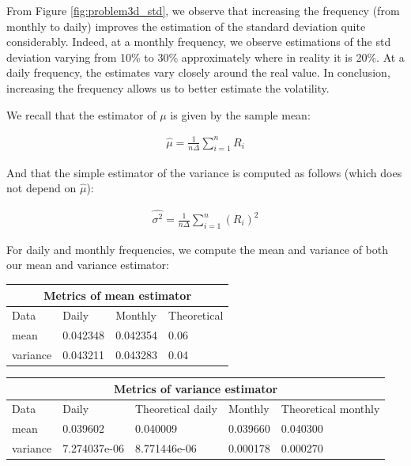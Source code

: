 \documentclass[10pt]{article}
\newenvironment{exercise}[2][Exercise]{\begin{trivlist}
  \item[\hskip \labelsep {\bfseries #1}\hskip \labelsep {\bfseries #2.}]}{\end{trivlist}}
\begin{document}
\begin{exercise}{3}
	\smallbreak
	
	From Figure \ref{fig:problem3d_std}, we observe that increasing the frequency (from monthly to daily) improves the estimation of the standard deviation quite considerably. Indeed, at a monthly frequency, we observe estimations of the std deviation varying from 10\% to 30\% approximately where in reality it is 20\%. At a daily frequency, the estimates vary closely around the real value. In conclusion, increasing the frequency allows us to better estimate the volatility. 
  
	\bigbreak
	
	 We recall that the estimator of $\mu$ is given by the sample mean:
	 
	\begin{align*}
		\hat{\mu} = \frac{1}{n \Delta}\sum^{n}_{i = 1}R_{i}
	\end{align*}
	
	And that the simple estimator of the variance is computed as follows (which does not depend on $\hat{\mu}$):
	
	\begin{align*}
		\hat{\sigma^{2}} = \frac{1}{n \Delta}\sum^{n}_{i = 1}(R_{i})^{2}
	\end{align*}
	 
	 For daily and monthly frequencies, we compute the mean and variance of both our mean and variance estimator:
	 
	 \bigbreak
	 
	 \begin{tabular}{ |p{3cm}||p{3cm}|p{3cm}|p{3cm}| }
		\hline
	 	\multicolumn{4}{|c|}{Metrics of mean estimator} \\
	 	\hline
	 	Data & Daily & Monthly & Theoretical\\
 		\hline
 		mean  &  0.042348 & 0.042354 & 0.06 \\
 		variance & 0.043211 & 0.043283 & 0.04\\
 		\hline
	\end{tabular}
	
	\bigbreak	
	
	\begin{tabular}{ |p{2cm}||p{2cm}|p{3cm}|p{2cm}|p{3cm}| }
		\hline
	 	\multicolumn{5}{|c|}{Metrics of variance estimator} \\
	 	\hline
	 	Data & Daily & Theoretical daily  & Monthly & Theoretical monthly \\
 		\hline
 		mean  &  0.039602 & 0.040009 & 0.039660 & 0.040300\\
 		variance & 7.274037e-06 & 8.771446e-06 & 0.000178 & 0.000270 \\
 		\hline
	\end{tabular}
	
	\bigbreak

	  
  
  \end{exercise}
\end{document}
